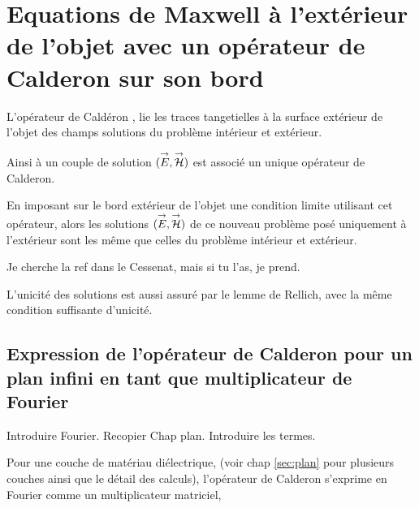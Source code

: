 \section{Equations de Maxwell à l'extérieur de l'objet avec un opérateur de Calderon sur son bord}
    L'opérateur de Caldéron \cite[Def~4, p.~108]{cessenat_mathematical_1996}, lie les traces tangetielles à la surface extérieur de l'objet des champs solutions du problème intérieur et extérieur.
    
    Ainsi à un couple de solution \((\vE,\vH)\) est associé un unique opérateur de Calderon.

    En imposant sur le bord extérieur de l'objet une condition limite utilisant cet opérateur, alors les solutions \((\vE,\vH)\) de ce nouveau problème posé uniquement à l'extérieur sont les même que celles du problème intérieur et extérieur.

    \begin{REM}
        Je cherche la ref dans le Cessenat, mais si tu l'as, je prend.
    \end{REM}

    L'unicité des solutions est aussi assuré par le lemme de Rellich, avec la même condition suffisante d'unicité.

    \subsection{Expression de l'opérateur de Calderon pour un plan infini en tant que multiplicateur de Fourier}

        \begin{REM}
            Introduire Fourier. Recopier Chap plan. Introduire les termes.
        \end{REM}

        \begin{figure}[!h]
            \begin{center}
                \begin{tikzpicture}
                    
                \end{tikzpicture}
            \end{center}
        \end{figure}

        Pour une couche de matériau diélectrique, (voir chap \ref{sec:plan} pour plusieurs couches ainsi que le détail des calculs), l'opérateur de Calderon s'exprime en Fourier comme un multiplicateur matriciel,

